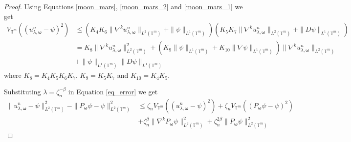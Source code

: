 \documentclass[multixcb]{amstext-l}
\theoremstyle{plain}
\theoremstyle{definition}
\theoremstyle{definition}
\theoremstyle{remark}
\numberwithin{equation}{chapter}
\begin{document}
\begin{proof}
Using Equations \ref{moon_mars}, \ref{moon_mars_2} and \ref{moon_mars_1} we get
\begin{equation}\label{final_moon_mars}
    \begin{aligned}
    V_{\mathbb{T}^m}((u_{\lambda,\boldsymbol{\omega}}^n - \psi)^2) &\le \left(K_4K_6 \|\nabla^k u_{\lambda,\boldsymbol{\omega}}^n\|_{L^2(\mathbb{T}^m)} + \|\psi\|_{L^1(\mathbb{T}^m)}  \right) \left(K_5K_7 \|\nabla^k u_{\lambda,\boldsymbol{\omega}}^n\|_{L^2(\mathbb{T}^m)} + \|D \psi\|_{L^1(\mathbb{T}^m)} \right)\\
    &= K_8 \|\nabla^k u_{\lambda,\boldsymbol{\omega}}^n\|^2_{L^2(\mathbb{T}^m)} +\left(K_9\|\psi\|_{L^1(\mathbb{T}^m)} + K_{10}\|\nabla \psi\|_{L^1(\mathbb{T}^m)} \right)\|\nabla^k u_{\lambda,\boldsymbol{\omega}}^n\|_{L^2(\mathbb{T}^m)}\\ &+ \|\psi\|_{L^1(\mathbb{T}^m)} \|D \psi\|_{L^1(\mathbb{T}^m)}
    \end{aligned}
\end{equation}
where $K_8 = K_4K_5K_6K_7$, $K_9 = K_5K_7$ and $K_{10} = K_4 K_5$.

Substituting $\lambda = \zeta^{-\beta}_n$ in Equation \ref{eq_error} we get
\begin{equation}\label{eq_error_2}
\begin{aligned}
\|u_{\lambda,\boldsymbol{\omega}}^n - \psi\|^2_{L^2(\mathbb{T}^m)}  -    \|P_{\boldsymbol{\omega}}\psi - \psi\|^2_{L^2(\mathbb{T}^m)} &\le \zeta_n  V_{\mathbb{T}^m}((u_{\lambda,\boldsymbol{\omega}}^n - \psi)^2)  + \zeta_n V_{\mathbb{T}^m}((P_{\boldsymbol{\omega}}\psi-\psi)^2)\\  &+ \zeta^{\beta}_n\|\nabla^kP_{\boldsymbol{\omega}}\psi\|_{L^2(\mathbb{T}^m)}^2 + \zeta^{2\beta}_n\|P_{\boldsymbol{\omega}}\psi\|_{L^2(\mathbb{T}^m)}^2
\end{aligned}
\end{equation}


\end{proof}
\end{document}
